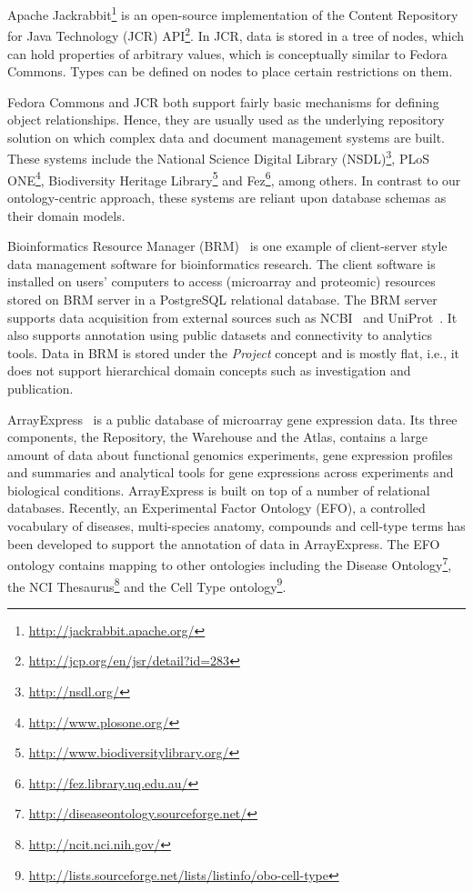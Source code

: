 \documentclass[preprint,12pt]{elsarticle}
\begin{document}
Apache Jackrabbit\footnote{\url{http://jackrabbit.apache.org/}} is an open-source implementation of the Content Repository for Java Technology (JCR) API\footnote{\url{http://jcp.org/en/jsr/detail?id=283}}. In JCR, data is stored in a tree of nodes, which can hold properties of arbitrary values, which is conceptually similar to Fedora Commons. Types can be defined on nodes to place certain restrictions on them.

Fedora Commons and JCR both support fairly basic mechanisms for defining object relationships. Hence, they are usually used as the underlying repository solution on which complex data and document management systems are built. These systems include the National Science Digital Library (NSDL)\footnote{\url{http://nsdl.org/}}, PLoS ONE\footnote{\url{http://www.plosone.org/}}, Biodiversity Heritage Library\footnote{\url{http://www.biodiversitylibrary.org/}} and Fez\footnote{\url{http://fez.library.uq.edu.au/}}, among others. In contrast to our ontology-centric approach, these systems are reliant upon database schemas as their domain models.


Bioinformatics Resource Manager (BRM)~\cite{brm2007} is one example of client-server style data management software for bioinformatics research. The client software is installed on users' computers to access (microarray and proteomic) resources stored on BRM server in a PostgreSQL relational database. The BRM server supports data acquisition from external sources such as NCBI~\cite{ncbi} and UniProt~\cite{citeulike:503151}. It also supports annotation using public datasets and connectivity to analytics tools. Data in BRM is stored under the \emph{Project} concept and is mostly flat, i.e., it does not support hierarchical domain concepts such as investigation and publication. %

ArrayExpress~\cite{citeulike:3501974} is a public database of microarray gene expression data. Its three components, the Repository, the Warehouse and the Atlas, contains a large amount of data about functional genomics experiments, gene expression profiles and summaries and analytical tools for gene expressions across experiments and biological conditions. ArrayExpress is built on top of a number of relational databases. Recently, an Experimental Factor Ontology (EFO), a controlled vocabulary of diseases, multi-species anatomy, compounds and cell-type terms has been developed to support the annotation of data in ArrayExpress. The EFO ontology contains mapping to other ontologies including the Disease Ontology\footnote{\url{http://diseaseontology.sourceforge.net/}}, the NCI Thesaurus\footnote{\url{http://ncit.nci.nih.gov/}} and the Cell Type ontology\footnote{\url{http://lists.sourceforge.net/lists/listinfo/obo-cell-type}}.
\end{document}
